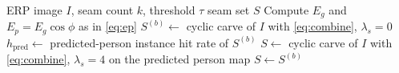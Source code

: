 \begin{algorithm}[H]
\caption{Content-conditioned cyclic seam carving (practical gate)}
\label{alg:ccsc}
\begin{algorithmic}[1]
\Require ERP image $I$, seam count $k$, threshold $\tau$
\Ensure seam set $S$
\State Compute $E_g$ and $E_p=E_g\cos\phi$ as in \eqref{eq:ep}
\State $S^{(b)}\gets$ cyclic carve of $I$ with \eqref{eq:combine}, $\lambda_s=0$
\State $h_{\mathrm{pred}}\gets$ predicted-person instance hit rate of $S^{(b)}$
  \State $S\gets$ cyclic carve of $I$ with \eqref{eq:combine}, $\lambda_s=4$ on the predicted person map
\Else
  \State $S\gets S^{(b)}$
\EndIf
\end{algorithmic}
\end{algorithm}
